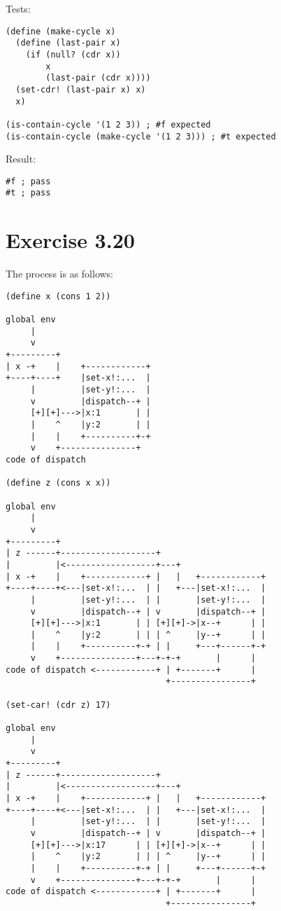 \documentclass[../main.tex]{subfiles}
\begin{document}
Tests:

\begin{lstlisting}
(define (make-cycle x)
  (define (last-pair x)
    (if (null? (cdr x))
        x
        (last-pair (cdr x))))
  (set-cdr! (last-pair x) x)
  x)

(is-contain-cycle '(1 2 3)) ; #f expected
(is-contain-cycle (make-cycle '(1 2 3))) ; #t expected
\end{lstlisting}

Result:

\begin{lstlisting}
#f ; pass
#t ; pass
\end{lstlisting}

\section{Exercise 3.20}

The process is as follows:

\begin{lstlisting}
(define x (cons 1 2))

global env
     |
     v
+---------+
| x -+    |    +------------+
+----+----+    |set-x!:...  |
     |         |set-y!:...  |
     v         |dispatch--+ |
     [+][+]--->|x:1       | |
     |    ^    |y:2       | |
     |    |    +----------+-+
     v    +---------------+
code of dispatch

(define z (cons x x))

global env
     |
     v
+---------+
| z ------+-------------------+
|         |<------------------+---+
| x -+    |    +------------+ |   |   +------------+
+----+----+<---|set-x!:...  | |   +---|set-x!:...  |
     |         |set-y!:...  | |       |set-y!:...  |
     v         |dispatch--+ | v       |dispatch--+ |
     [+][+]--->|x:1       | | [+][+]->|x--+      | |
     |    ^    |y:2       | | | ^     |y--+      | |
     |    |    +----------+-+ | |     +---+------+-+
     v    +---------------+---+-+-+       |      |
code of dispatch <------------+ | +-------+      |
                                +----------------+

(set-car! (cdr z) 17)

global env
     |
     v
+---------+
| z ------+-------------------+
|         |<------------------+---+
| x -+    |    +------------+ |   |   +------------+
+----+----+<---|set-x!:...  | |   +---|set-x!:...  |
     |         |set-y!:...  | |       |set-y!:...  |
     v         |dispatch--+ | v       |dispatch--+ |
     [+][+]--->|x:17      | | [+][+]->|x--+      | |
     |    ^    |y:2       | | | ^     |y--+      | |
     |    |    +----------+-+ | |     +---+------+-+
     v    +---------------+---+-+-+       |      |
code of dispatch <------------+ | +-------+      |
                                +----------------+
\end{lstlisting}
\end{document}
